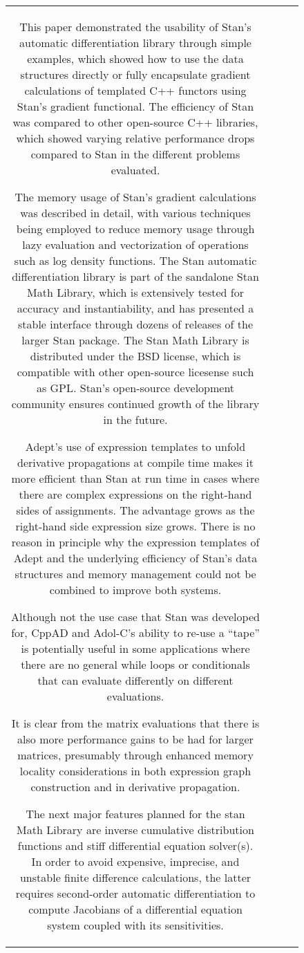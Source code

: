 \documentclass[12pt]{article}
\begin{document}
\begin{figure}
\begin{center}
\begin{tabular}{c||c|cc}
This paper demonstrated the usability of Stan's automatic
differentiation library through simple examples, which showed how to
use the data structures directly or fully encapsulate gradient
calculations of templated C++ functors using Stan's gradient
functional.  The efficiency of Stan was compared to other open-source
C++ libraries, which showed varying relative performance drops
compared to Stan in the different problems evaluated.

The memory usage of Stan's gradient calculations was described
in detail, with various techniques being employed to reduce memory
usage through lazy evaluation and vectorization of operations such as
log density functions.  The Stan automatic differentiation library is
part of the sandalone Stan Math Library, which is extensively tested
for accuracy and instantiability, and has presented a stable interface
through dozens of releases of the larger Stan package.  The Stan Math
Library is distributed under the BSD license, which is compatible with
other open-source licesense such as GPL.  Stan's open-source
development community ensures continued growth of the library in the
future.

Adept's use of expression templates to unfold derivative propagations
at compile time makes it more efficient than Stan at run time in cases
where there are complex expressions on the right-hand sides of
assignments.  The advantage grows as the right-hand side expression
size grows.  There is no reason in principle why the expression
templates of Adept and the underlying efficiency of Stan's data
structures and memory management could not be combined to improve both
systems.

Although not the use case that Stan was developed for, CppAD and
Adol-C's ability to re-use a ``tape'' is potentially useful in some
applications where there are no general while loops or conditionals
that can evaluate differently on different evaluations.

It is clear from the matrix evaluations that there is also more
performance gains to be had for larger matrices, presumably through
enhanced memory locality considerations in both expression graph
construction and in derivative propagation.

The next major features planned for the stan Math Library are inverse
cumulative distribution functions and stiff differential equation
solver(s).  In order to avoid expensive, imprecise, and unstable finite
difference calculations, the latter requires second-order automatic
differentiation to compute Jacobians of a differential equation system
coupled with its sensitivities.


\end{tabular}
\end{center}
\end{figure}
\end{document}
